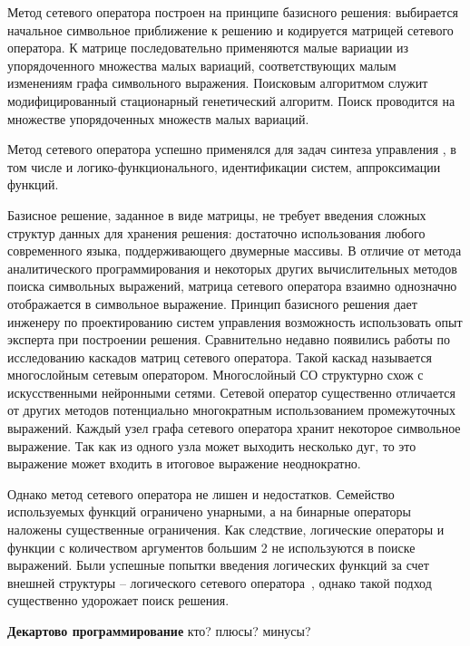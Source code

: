 Метод сетевого оператора построен на принципе базисного решения: выбирается начальное символьное приближение к решению и кодируется матрицей сетевого оператора.
К матрице последовательно применяются малые вариации из упорядоченного множества малых вариаций, соответствующих малым изменениям графа символьного выражения.
Поисковым алгоритмом служит модифицированный стационарный генетический алгоритм.
Поиск проводится на множестве упорядоченных множеств малых вариаций.

Метод сетевого оператора успешно применялся для задач синтеза управления , в том числе и логико-функционального, идентификации систем, аппроксимации функций.

Базисное решение, заданное в виде матрицы, не требует введения сложных структур данных для хранения решения: достаточно использования любого современного языка, поддерживающего двумерные массивы.
В отличие от метода аналитического программирования и некоторых других вычислительных методов поиска символьных выражений, матрица сетевого оператора взаимно однозначно отображается в символьное выражение.
Принцип базисного решения дает инженеру по проектированию систем управления возможность использовать опыт эксперта при построении решения.
Сравнительно недавно появились работы по исследованию каскадов матриц сетевого оператора.
Такой каскад называется многослойным сетевым оператором.
Многослойный СО структурно схож с искусственными нейронными сетями.
Сетевой оператор существенно отличается от других методов потенциально многократным использованием промежуточных выражений.
Каждый узел графа сетевого оператора хранит некоторое символьное выражение.
Так как из одного узла может выходить несколько дуг, то это выражение может входить в итоговое выражение неоднократно.

Однако метод сетевого оператора не лишен и недостатков.
Семейство используемых функций ограничено унарными, а на бинарные операторы наложены существенные ограничения.
Как следствие, логические операторы и функции с количеством аргументов большим 2 не используются в поиске выражений.
Были успешные попытки введения логических функций за счет внешней структуры -- логического сетевого оператора~\cite{ДивСофр2012, АтиенДивеев2012}, однако такой подход существенно удорожает поиск решения.

\textbf{Декартово программирование} кто? плюсы? минусы?

